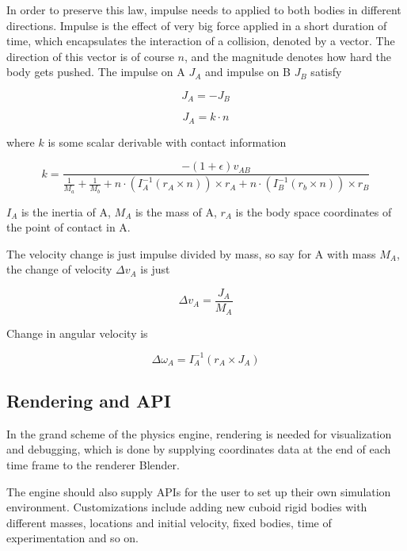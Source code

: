 \documentclass[12pt,a4paper,twoside,openright]{report}
\begin{document}
In order to preserve this law, impulse needs to applied to both bodies in different directions. Impulse is the effect of very big force applied in a short duration of time, which encapsulates the interaction of a collision, denoted by a vector. The direction of this vector is of course $n$, and the magnitude denotes how hard the body gets pushed. The impulse on A $J_A$ and impulse on B $J_B$ satisfy

\begin{equation}
J_A = -J_B
\end{equation}

\begin{equation}
J_A = k \cdot n
\end{equation}

where $k$ is some scalar derivable with contact information

\begin{equation}
k=\frac{-(1+\epsilon)v_{AB}}{\frac{1}{M_a}+\frac{1}{M_b}+n\cdot (I_A^{-1}(r_A\times n)) \times r_A + n\cdot (I_B^{-1}(r_b \times n)) \times r_B}
\end{equation}

$I_A$ is the inertia of A, $M_A$ is the mass of A, $r_A$ is the body space coordinates of the point of contact in A.

The velocity change is just impulse divided by mass, so say for A with mass $M_A$, the change of velocity $\Delta v_A$ is just

\begin{equation}
\Delta v_A = \frac{J_A}{M_A}
\end{equation}

Change in angular velocity is

\begin{equation}
\Delta \omega_A = I_A^{-1} (r_A \times J_A)
\end{equation}

\subsection{Rendering and API}

In the grand scheme of the physics engine, rendering is needed for visualization and debugging, which is done by supplying coordinates data at the end of each time frame to the renderer Blender.

The engine should also supply APIs for the user to set up their own simulation environment. Customizations include adding new cuboid rigid bodies with different masses, locations and initial velocity, fixed bodies, time of experimentation and so on.
\end{document}
